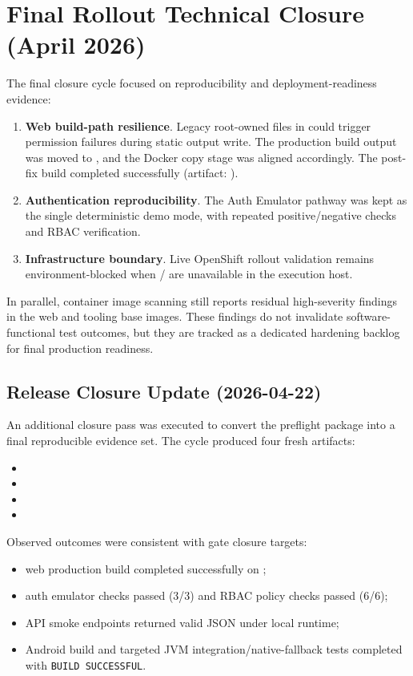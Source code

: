 \section{Final Rollout Technical Closure (April 2026)}
The final closure cycle focused on reproducibility and deployment-readiness evidence:
\begin{enumerate}
    \item \textbf{Web build-path resilience}. Legacy root-owned files in  could trigger permission failures during static output write. The production build output was moved to , and the Docker copy stage was aligned accordingly. The post-fix build completed successfully (artifact: ).
    \item \textbf{Authentication reproducibility}. The Auth Emulator pathway was kept as the single deterministic demo mode, with repeated positive/negative checks and RBAC verification.
    \item \textbf{Infrastructure boundary}. Live OpenShift rollout validation remains environment-blocked when / are unavailable in the execution host.
\end{enumerate}

In parallel, container image scanning still reports residual high-severity findings in the web and tooling base images. These findings do not invalidate software-functional test outcomes, but they are tracked as a dedicated hardening backlog for final production readiness.

\subsection{Release Closure Update (2026-04-22)}
An additional closure pass was executed to convert the preflight package into a final reproducible evidence set. The cycle produced four fresh artifacts:
\begin{itemize}
    \item {}
    \item {}
    \item {}
    \item {}
\end{itemize}

Observed outcomes were consistent with gate closure targets:
\begin{itemize}
    \item web production build completed successfully on ;
    \item auth emulator checks passed (3/3) and RBAC policy checks passed (6/6);
    \item API smoke endpoints returned valid JSON under local runtime;
    \item Android build and targeted JVM integration/native-fallback tests completed with \texttt{BUILD SUCCESSFUL}.
\end{itemize}

